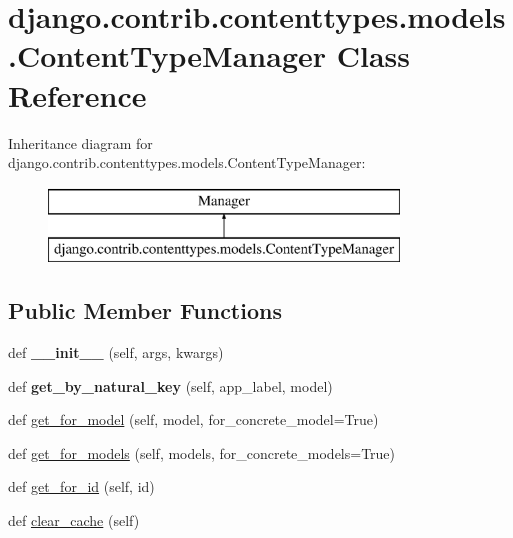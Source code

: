 \hypertarget{classdjango_1_1contrib_1_1contenttypes_1_1models_1_1_content_type_manager}{}\section{django.\+contrib.\+contenttypes.\+models.\+Content\+Type\+Manager Class Reference}
\label{classdjango_1_1contrib_1_1contenttypes_1_1models_1_1_content_type_manager}
Inheritance diagram for django.\+contrib.\+contenttypes.\+models.\+Content\+Type\+Manager\+:\begin{figure}[H]
\begin{center}
\leavevmode
\includegraphics[height=2.000000cm]{classdjango_1_1contrib_1_1contenttypes_1_1models_1_1_content_type_manager}
\end{center}
\end{figure}
\subsection*{Public Member Functions}
\begin{DoxyCompactItemize}
\item 
\mbox{\label{classdjango_1_1contrib_1_1contenttypes_1_1models_1_1_content_type_manager_a9888b88db8835b8503ea267477605b93}} 
def {\bfseries \+\_\+\+\_\+init\+\_\+\+\_\+} (self, args, kwargs)
\item 
\mbox{\label{classdjango_1_1contrib_1_1contenttypes_1_1models_1_1_content_type_manager_ad441204452d12dc6932ed82679c8b373}} 
def {\bfseries get\+\_\+by\+\_\+natural\+\_\+key} (self, app\+\_\+label, model)
\item 
def \mbox{\hyperlink{classdjango_1_1contrib_1_1contenttypes_1_1models_1_1_content_type_manager_a31597c87e55555c8ea39c68d3507ab88}{get\+\_\+for\+\_\+model}} (self, model, for\+\_\+concrete\+\_\+model=True)
\item 
def \mbox{\hyperlink{classdjango_1_1contrib_1_1contenttypes_1_1models_1_1_content_type_manager_ad5432762eb41d500a9b59a52155d8c87}{get\+\_\+for\+\_\+models}} (self, models, for\+\_\+concrete\+\_\+models=True)
\item 
def \mbox{\hyperlink{classdjango_1_1contrib_1_1contenttypes_1_1models_1_1_content_type_manager_a77e45a678787e583675e13f9a4d05b31}{get\+\_\+for\+\_\+id}} (self, id)
\item 
def \mbox{\hyperlink{classdjango_1_1contrib_1_1contenttypes_1_1models_1_1_content_type_manager_a8c0e3cd09eab9f713c1f4d2dda32d97c}{clear\+\_\+cache}} (self)
\end{DoxyCompactItemize}
